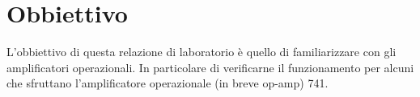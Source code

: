 \section*{Obbiettivo}

L'obbiettivo di questa relazione di laboratorio è quello di familiarizzare con gli amplificatori operazionali. In particolare di verificarne il funzionamento per alcuni che sfruttano l'amplificatore operazionale (in breve op-amp) 741.
